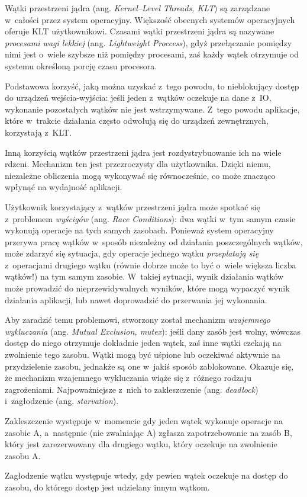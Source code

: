 %
\indent
	Wątki przestrzeni jądra (ang. \emph{Kernel--Level Threads, KLT}) są zarządzane w~całości przez system operacyjny. 
	Większość obecnych systemów operacyjnych oferuje KLT użytkownikowi. Czasami wątki przestrzeni jądra są nazywane
	\emph{procesami wagi lekkiej} (ang. \emph{Lightweight Proccess}), gdyż przełączanie pomiędzy nimi jest o~wiele
	szybsze niż pomiędzy procesami, zaś każdy wątek otrzymuje od systemu określoną porcję czasu procesora.
\par
%
\indent
	Podstawowa korzyść, jaką można uzyskać z~tego powodu, to nieblokujący dostęp do urządzeń wejścia-wyjścia:
	jeśli jeden z~wątków oczekuje na dane z~IO, wykonanie pozostałych wątków nie jest wstrzymywane.
	Z~tego powodu aplikacje, które w~trakcie działania często odwołują się do urządzeń zewnętrznych, korzystają
	z~KLT.
\par
%
\indent
	Inną korzyścią wątków przestrzeni jądra jest rozdystrybuowanie ich na wiele rdzeni. Mechanizm ten jest przezroczysty
	dla użytkownika. Dzięki niemu, niezależne obliczenia mogą wykonywać się równocześnie, co może znacząco wpłynąć na
	wydajność aplikacji.
\par
%
\indent
	Użytkownik korzystający z~wątków przestrzeni jądra może spotkać się z~problemem \emph{wyścigów} (ang. \emph{Race Conditions}):
	dwa wątki w~tym samym czasie wykonują operacje na tych samych zasobach. Ponieważ system operacyjny przerywa pracę wątków w~sposób
	niezależny od działania poszczególnych wątków, może zdarzyć się sytuacja, gdy operacje jednego wątku \emph{przeplatają się} z~operacjami
	drugiego wątku (równie dobrze może to być o~wiele większa liczba wątków!) na tym samym zasobie. W~takiej sytuacji, wynik działania wątków
	może prowadzić do nieprzewidywalnych wyników, które mogą wypaczyć wynik działania aplikacji, lub nawet doprowadzić do przerwania jej wykonania.
\par
%
\indent
	Aby zaradzić temu problemowi, stworzony został mechanizm \emph{wzajemnego wykluczania} (ang. \emph{Mutual Exclusion, mutex}):
	jeśli dany zasób jest wolny, wówczas dostęp do niego otrzymuje dokładnie jeden wątek, zaś inne wątki czekają na zwolnienie tego zasobu.
	Wątki mogą być uśpione lub oczekiwać aktywnie na przydzielenie zasobu, jednakże są one w~jakiś sposób zablokowane.  
	Okazuje się, że mechanizm wzajemnego wykluczania wiąże się z~różnego rodzaju zagrożeniami. Najpoważniejsze z~nich to zakleszczenie 
	(ang. \emph{deadlock}) i~zagłodzenie (ang. \emph{starvation}).
\par
%
\indent
	Zakleszczenie występuje w~momencie gdy jeden wątek wykonuje operacje na zasobie A, a~następnie (nie zwalniając A) zgłasza zapotrzebowanie
	na zasób B, który jest zarezerwowany dla drugiego wątku, który oczekuje na zwolnienie zasobu A.
\par
%
\indent
	Zagłodzenie wątku występuje wtedy, gdy pewien wątek oczekuje na dostęp do zasobu, do którego dostęp jest udzielany innym wątkom.
\par

